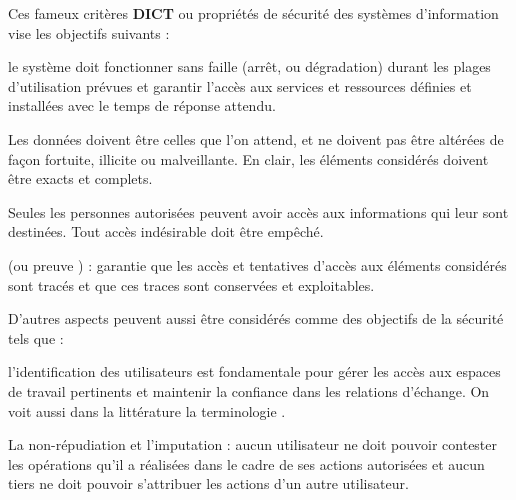 Ces fameux critères \textbf{DICT} ou propriétés de sécurité des systèmes d'information vise les objectifs suivants :
\begin{nota}[DISPONIBILITE]
le système doit fonctionner sans faille (arrêt, ou dégradation) durant les plages d'utilisation prévues et garantir l'accès aux services et ressources définies et installées avec le temps de réponse attendu.
\end{nota}
\begin{nota}[INTEGRITE]
Les données doivent être celles que l'on attend, et ne doivent pas être altérées de façon fortuite, illicite ou malveillante. En clair, les éléments considérés doivent être exacts et complets.
\end{nota}
\begin{nota}[CONFIDENTIALITE] Seules les personnes autorisées peuvent avoir accès aux informations qui leur sont destinées. Tout accès indésirable doit être empêché.
\end{nota}
\begin{nota}[TRACABILITE] (ou preuve ) : garantie que les accès et tentatives d'accès aux éléments considérés sont tracés et que ces traces sont conservées et exploitables.
\end{nota}
D'autres aspects peuvent aussi être considérés comme des objectifs de la sécurité tels que :
\begin{nota}[AUTHENTICITE]
l'identification des utilisateurs est fondamentale pour gérer les accès aux espaces de travail pertinents et maintenir la confiance dans les relations d'échange. On voit aussi dans la littérature la terminologie .
\end{nota}
\begin{nota}
La non-répudiation et l'imputation : aucun utilisateur ne doit pouvoir contester les opérations qu'il a réalisées dans le cadre de ses actions autorisées et aucun tiers ne doit pouvoir s'attribuer les actions d'un autre utilisateur.
\end{nota}

